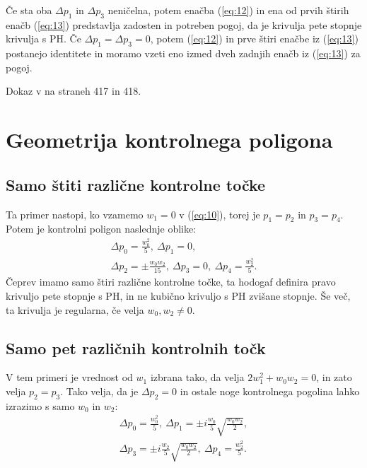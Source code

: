 \documentclass[a4paper]{IEEEtran}
\begin{document}
	Če sta oba $\Delta p_1$ in $\Delta p_3$ neničelna, potem enačba (\ref{eq:12}) in ena od prvih štirih enačb (\ref{eq:13}) predstavlja zadosten in potreben pogoj, da je krivulja pete stopnje krivulja s PH. Če $\Delta p_1=\Delta p_3=0$, potem (\ref{eq:12}) in prve štiri enačbe iz (\ref{eq:13}) postanejo identitete in moramo vzeti eno izmed dveh zadnjih enačb iz (\ref{eq:13}) za pogoj.
	
	\proof
	Dokaz v \cite{knjiga} na straneh 417 in 418.
	\endproof
	
	\section{Geometrija kontrolnega poligona}

	
	\subsection{Samo štiti različne kontrolne točke}
	Ta primer nastopi, ko vzamemo $w_1=0$ v (\ref{eq:10}), torej je $p_1=p_2$ in $p_3=p_4$. Potem je kontrolni poligon naslednje oblike:
	\begin{eqnarray}
	\Delta p_0=\frac{w_0^2}{5}, \ \Delta p_1=0, \nonumber \\
	\Delta p_2 =\pm \frac{w_0w_2}{15}, \ \Delta p_3=0, \ \Delta p_4=\frac{w_2^2}{5}. \nonumber 
	\end{eqnarray}
	Čeprev imamo samo štiri različne kontrolne točke, ta hodogaf definira pravo krivuljo pete stopnje s PH, in ne kubično krivuljo s PH zvišane stopnje. Še več, ta krivulja je regularna, če velja $w_0,w_2 \neq 0$.
	
	\subsection{Samo pet različnih kontrolnih točk}
	V tem primeri je vrednost od $w_1$ izbrana tako, da velja $2w_1^2+w_0w_2=0$, in zato velja $p_2=p_3$. Tako velja, da je $\Delta p_2=0$ in ostale noge kontrolnega pogolina lahko izrazimo s samo $w_0$ in $w_2$:
	\begin{eqnarray}
	\Delta p_0=\frac{w_0^2}{5}, \ \Delta p_1=\pm i \frac{w_0}{5}\sqrt{\frac{w_0w_2}{2}}, \nonumber \\
	\Delta p_3 =\pm i\frac{w_2}{5}\sqrt{\frac{w_0w_2}{2}}, \ \Delta p_4=\frac{w_2^2}{5}. \nonumber
	\end{eqnarray}
	
\end{document}

